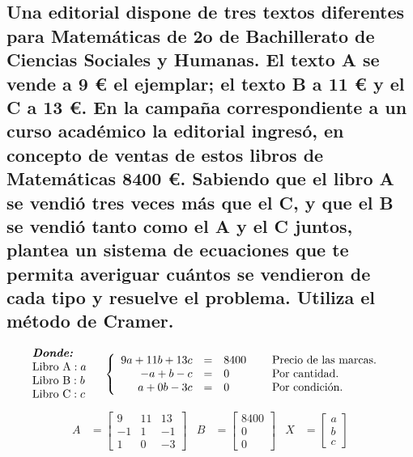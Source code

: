 \documentclass[10pt, a4paper]{article}
\begin{document}
\subsection{Una editorial dispone de tres textos diferentes para Matemáticas de 2o de Bachillerato de Ciencias Sociales y Humanas. El texto A se vende a 9 € el ejemplar; el texto B a 11 € y el C a 13 €. En la campaña correspondiente a un curso académico la editorial ingresó, en concepto de ventas de estos libros de Matemáticas 8400 €. Sabiendo que el libro A se vendió tres veces más que el C, y que el B se vendió tanto como el A y el C juntos, plantea un sistema de ecuaciones que te permita averiguar cuántos se vendieron de cada tipo y resuelve el problema. Utiliza el método de Cramer.}
\begin{align*}
  &\begin{array}{l}
      \textit{\textbf{Donde:}}\\
      \text{Libro A}: a\\
      \text{Libro B}: b\\
      \text{Libro C}: c\\
  \end{array}
  \quad
  \left\{
  \begin{array}{rcl}
    9a + 11b + 13c &= &8400\\
    -a +b -c &= &0\\
    a + 0b - 3c &= &0
  \end{array}
  \right.
  \quad
  \begin{array}{l}
    \text{Precio de las marcas.}\\
    \text{Por cantidad.}\\
    \text{Por condición.}
  \end{array}
\end{align*}
\begin{align*}
  A &= \begin{bmatrix}
    9 & 11 & 13\\
    -1 & 1 & -1\\
    1 & 0 & -3
  \end{bmatrix}&
  B &= \begin{bmatrix}
    8400\\
    0\\
    0
  \end{bmatrix}&
  X &= \begin{bmatrix}
    a\\
    b\\
    c
  \end{bmatrix}
\end{align*}
\end{document}
